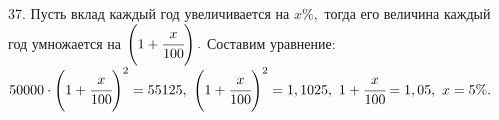 37. Пусть вклад каждый год увеличивается на $x\%,$ тогда его величина каждый год умножается на $\left(1+\cfrac{x}{100}\right).$ Составим уравнение:
$50000\cdot\left(1+\cfrac{x}{100}\right)^2=55125,\ \left(1+\cfrac{x}{100}\right)^2=1,1025,\ 1+\cfrac{x}{100}=1,05,\ x=5\%.$\\
